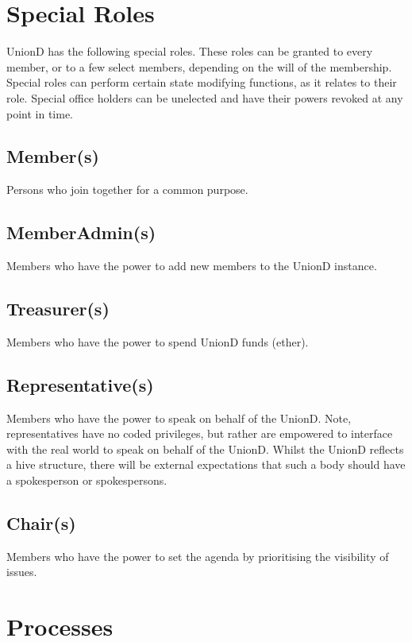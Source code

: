 \documentclass[12pt,twocolumn]{article}
\begin{document}
\section {Special Roles}

UnionD has the following special roles. These roles can be granted to every member, or to a few select members, depending on the will of the membership. Special roles can perform certain state modifying functions, as it relates to their role. Special office holders can be unelected and have their powers revoked at any point in time.

\subsection {Member(s)}

Persons who join together for a common purpose.

\subsection{MemberAdmin(s)}

Members who have the power to add new members to the UnionD instance.

\subsection{Treasurer(s)}

Members who have the power to spend UnionD funds (ether).

\subsection{Representative(s)}

Members who have the power to speak on behalf of the UnionD. Note, representatives have no coded privileges, but rather are empowered to interface with the real world to speak on behalf of the UnionD. Whilst the UnionD reflects a hive structure, there will be external expectations that such a body should have a spokesperson or spokespersons.

\subsection{Chair(s)}

Members who have the power to set the agenda by prioritising the visibility of issues.

\section {Processes}
\end{document}
